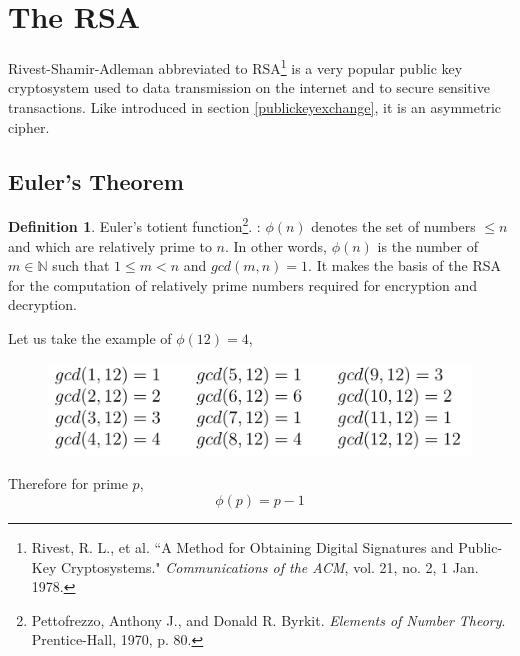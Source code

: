 \documentclass[a4paper,12pt]{article}
\theoremstyle{definition}
\newtheorem{definition}{Definition}
\begin{document}
\newpage
\section{The RSA} \label{rsamainsection}
Rivest-Shamir-Adleman abbreviated to RSA\footnote{Rivest, R. L., et al. ``A Method for Obtaining Digital Signatures and Public-Key Cryptosystems." \textit{Communications of the ACM}, vol. 21, no. 2, 1 Jan. 1978.} is a very popular public key cryptosystem used to data transmission on the internet and to secure sensitive transactions. Like introduced in section \ref{publickeyexchange}, it is an asymmetric cipher.

\subsection{Euler's Theorem}

\begin{definition}{Euler's totient function\footnote{Pettofrezzo, Anthony J., and Donald R. Byrkit. \textit{Elements of Number Theory}. Prentice-Hall, 1970, p. 80.}. :}
	$\phi(n)$ denotes the set of numbers $\leq n$ and which are relatively prime to $n$. In other words, $\phi(n)$ is the number of $m \in \mathbb{N}$ such that $1 \leq m < n$ and $gcd(m,n)=1$. It makes the basis of the RSA for the computation of relatively prime numbers required for encryption and decryption.
\end{definition}
Let us take the example of $\phi(12)=4$,

\begin{figure}[H]
	 \centering
     \includegraphics[width=0.8\linewidth]{gcd}
\end{figure}
Therefore for prime $p$,
\begin{equation}
	\phi(p) = p-1
\end{equation}
\end{document}
